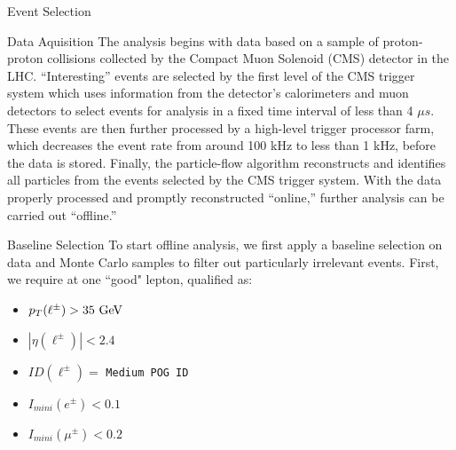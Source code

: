 \begin{section}{Event Selection}
\begin{subsection}{Data Aquisition}\label{data-aquisition}
The analysis begins with data based on a sample of proton-proton collisions collected by the Compact Muon Solenoid (CMS) detector in the LHC. ``Interesting'' events are selected by the first level of the CMS trigger system which uses information from the detector's calorimeters and muon detectors to select events for analysis in a fixed time interval of less than 4 $\mu s$. These events are then further processed by a high-level trigger processor farm, which decreases the event rate from around 100 kHz to less than 1 kHz, before the data is stored. Finally, the particle-flow algorithm reconstructs and identifies all particles from the events selected by the CMS trigger system. With the data properly processed and promptly reconstructed ``online,'' further analysis can be carried out ``offline.''
\end{subsection}
\begin{subsection}{Baseline Selection}\label{baseline-selection}
To start offline analysis, we first apply a baseline selection on data and Monte Carlo samples to filter out particularly irrelevant events. First, we require at one ``good" lepton, qualified as:
\begin{itemize}
    \item $p_{T}(\ell^{\pm}) > 35\textnormal{ GeV}$
    \item $|\eta(\ell^{\pm})| < 2.4$
    \item $ID(\ell^{\pm}) =$ \verb|Medium POG ID|
    \item $I_{mini}(e^{\pm}) < 0.1$
    \item $I_{mini}(\mu^{\pm}) < 0.2$
\end{itemize}


\end{subsection}
\end{section}
